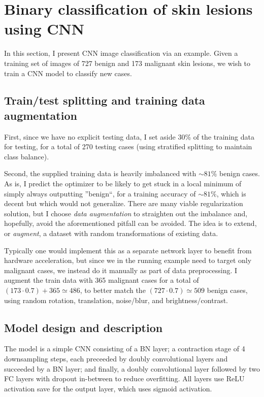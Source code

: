 \section{Binary classification of skin lesions using CNN}
\label{sec:skinlesion}

In this section, I present CNN image classification via an example. Given a
training set of images of 727 benign and 173 malignant skin lesions, we wish to
train a CNN model to classify new cases.

\subsection{Train/test splitting and training data augmentation}

First, since we have no explicit testing data, I set aside 30\% of the training
data for testing, for a total of 270 testing cases (using stratified splitting
to maintain class balance).

Second, the supplied training data is heavily imbalanced with $\sim81\%$ benign
cases. As is, I predict the optimizer to be likely to get stuck in a local
minimum of simply always outputting ''benign``, for a training accuracy of
$\sim81\%$, which is decent but which would not generalize. There are many
viable regularization solution, but I choose \emph{data augmentation} to
straighten out the imbalance and, hopefully, avoid the aforementioned pitfall
can be avoided. The idea is to extend, or \emph{augment}, a dataset with random
transformations of existing data.

Typically one would implement this as a separate network layer to benefit from
hardware acceleration, but since we in the running example need to target only
malignant cases, we instead do it manually as part of data preprocessing. I
augment the train data with 365 malignant cases for a total of $(173 \cdot 0.7) +
365 \simeq 486$, to better match the $(727 \cdot 0.7) \simeq 509$ benign cases,
using random rotation, translation, noise/blur, and brightness/contrast.

\subsection{Model design and description}
\label{sec:skinlesion_model}

The model is a simple CNN consisting of a BN layer; a contraction stage of 4
downsampling steps, each preceeded by doubly convolutional layers and succeeded
by a BN layer; and finally, a doubly convolutional layer followed by two FC
layers with dropout in-between to reduce overfitting. All layers use ReLU
activation save for the output layer, which uses sigmoid activation.

